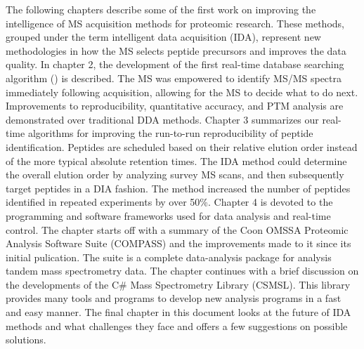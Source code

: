 The following chapters describe some of the first work on improving the intelligence of MS acquisition methods for proteomic research. These methods, grouped under the term intelligent data acquisition (IDA), represent new methodologies in how the MS selects peptide precursors and improves the data quality. In chapter 2, the development of the first real-time database searching algorithm (\inseq{}) is described. The MS was empowered to identify MS/MS spectra immediately following acquisition, allowing for the MS to decide what to do next. Improvements to reproducibility, quantitative accuracy, and PTM analysis are demonstrated over traditional DDA methods. Chapter 3 summarizes our real-time algorithms for improving the run-to-run reproducibility of peptide identification. Peptides are scheduled based on their relative elution order instead of the more typical absolute retention times. The IDA method could determine the overall elution order by analyzing survey MS scans, and then subsequently target peptides in a DIA fashion. The method increased the number of peptides identified in repeated experiments by over 50\%. Chapter 4 is devoted to the programming and software frameworks used for data analysis and real-time control. The chapter starts off with a summary of the Coon OMSSA Proteomic Analysis Software Suite (COMPASS) and the improvements made to it since its initial pulication.\cite{compass} The suite is a complete data-analysis package for analysis tandem mass spectrometry data. The chapter continues with a brief discussion on the developments of the C\# Mass Spectrometry Library (CSMSL). This library provides many tools and programs to develop new analysis programs in a fast and easy manner. The final chapter in this document looks at the future of IDA methods and what challenges they face and offers a few suggestions on possible solutions.





